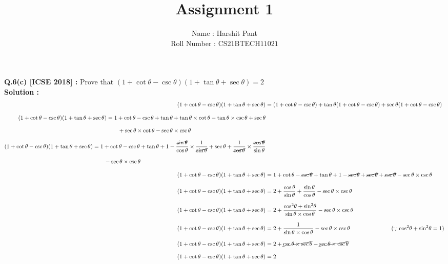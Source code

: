 \documentclass[a4paper,12pts]{article}
\title{\textbf{\Huge{Assignment 1}}}
\author{\Large{Name : Harshit Pant}\\\Large{Roll Number : CS21BTECH$11021$}}
\date{}
\begin{document}
\maketitle
\setlength{\parindent}{0cm}
\textbf{Q.6(c) [ICSE 2018] :}
Prove that $(1 +\cot\theta -\csc\theta)(1 + \tan\theta +\sec\theta)=2$\\

\textbf{Solution : }
\begin{align*}
(1+ \cot\theta -\csc\theta)(1+\tan\theta+\sec\theta)&=(1+\cot\theta-\csc\theta)+\tan\theta(1+\cot\theta-\csc\theta)+\sec\theta(1+\cot\theta-\csc\theta)\\[.1in]
\begin{split}
(1+ \cot\theta -\csc\theta)(1+\tan\theta+\sec\theta)&=1+\cot\theta-\csc\theta+\tan\theta+\tan\theta\times\cot\theta-\tan\theta\times\csc\theta+\sec\theta\\[.1in]
&\qquad
+\sec\theta\times\cot\theta-\sec\theta\times\csc\theta
\end{split}\\[.1in]
\begin{split}
(1+ \cot\theta -\csc\theta)(1+\tan\theta+\sec\theta)&=\displaystyle{1+\cot\theta-\csc\theta+\tan\theta+1-\frac{\cancel{\sin\theta}}{\cos\theta}\times\frac{1}{\cancel{\sin\theta}}+\sec\theta+\frac{1}{\cancel{\cos\theta}}\times\frac{\cancel{\cos\theta}}{\sin\theta}}\\[.1in]
&\qquad
-\sec\theta\times\csc\theta
\end{split}
\\[.1in]
(1+ \cot\theta -\csc\theta)(1+\tan\theta+\sec\theta)&=1+\cot\theta-\cancel{\csc\theta}+\tan\theta+1-\cancel{\sec\theta}+\cancel{\sec\theta}+\cancel{\csc\theta}-\sec\theta\times\csc\theta\\[.1in]
(1+ \cot\theta -\csc\theta)(1+\tan\theta+\sec\theta)&=2+\dfrac{\cos\theta}{\sin\theta}+\dfrac{\sin\theta}{\cos\theta}-\sec\theta\times\csc\theta\\[.1in]
(1+ \cot\theta -\csc\theta)(1+\tan\theta+\sec\theta)&=\displaystyle{2+\dfrac{{\cos}^2\theta+{\sin}^2\theta}{\sin\theta\times\cos\theta}-\sec\theta\times\csc\theta}\\[.1in]
(1+ \cot\theta -\csc\theta)(1+\tan\theta+\sec\theta)&=\displaystyle{2+\frac{1}{\sin\theta\times\cos\theta}-\sec\theta\times\csc\theta}\hspace{1in}
(\because{\cos}^2\theta+{\sin}^2\theta=1)\\[.1in]
(1+ \cot\theta -\csc\theta)(1+\tan\theta+\sec\theta)&=\displaystyle{2+\cancel{\csc\theta\times\sec\theta}-\cancel{\sec\theta\times\csc\theta}}\\[.1in]
(1+ \cot\theta -\csc\theta)(1+\tan\theta+\sec\theta)&=2
\end{align*}
\end{document}
